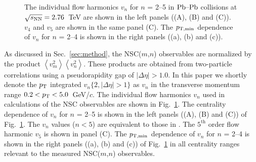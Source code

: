 \begin{figure}[t!]
	\begin{center}
        \caption{The individual flow harmonics $v_n$ for $n$ = 2--5 in $\textnormal{Pb--Pb}$ collisions at $\sqrt{s_{\textnormal{NN}}}=2.76$~TeV are shown in the left panels ((A), (B) and (C)). $v_4$ and $v_5$ are shown in the same panel (C). The $p_{\rm T, min}$ dependence of $v_n$ for $n$ = 2--4 is shown in the right panels ((a), (b) and (c)).}
        \label{fig:Figure_3}
        \end{center}   
\end{figure}

As discussed in Sec.~\ref{sec:method}, the NSC($m$,$n$) observables are normalized by the product $\left<v_{m}^2\right>\left<v_{n}^2\right>$.
These products are obtained from two-particle correlations using a pseudorapidity gap of $|\Delta\eta| > 1.0$. 
In this paper we shortly denote the $p_{\rm T}$ integrated $v_{n}\{2, |\Delta\eta|>1\}$ as $v_n$ in the transverse momentum range $0.2<p_{\rm T}<5.0$~GeV/$c$.
The individual flow harmonics $v_n$ used in calculations of the NSC observables are shown in Fig.~\ref{fig:Figure_3}.
The centrality dependence of $v_n$ for $n$ = 2--5 is shown in the left panels ((A), (B) and (C)) of  Fig.~\ref{fig:Figure_3}. The $v_n$ values ($n < 5$) are equivalent to those in \cite{Adam:2016izf}. The $5^{\mathrm{th}}$ order flow harmonic $v_5$ is shown in panel (C). The $p_{\rm T, min}$ dependence of $v_n$ for $n$ = 2--4 is shown in the right panels ((a), (b) and (c)) of Fig.~\ref{fig:Figure_3} in all centrality ranges relevant to the measured NSC($m$,$n$) observables.

